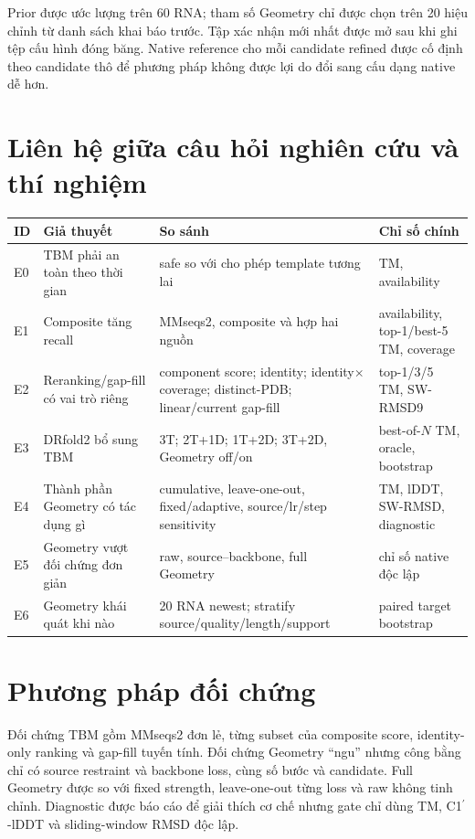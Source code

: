 \documentclass[12pt,a4paper,oneside]{report}
\newcommand{\cprime}{C1$^{\prime}$}
\begin{document}
Prior được ước lượng trên 60 RNA; tham số Geometry chỉ được chọn trên 20 hiệu chỉnh từ
danh sách khai báo trước. Tập xác nhận mới nhất được mở sau khi ghi tệp cấu hình đóng
băng. Native reference cho mỗi candidate refined được cố định theo candidate thô để
phương pháp không được lợi do đổi sang cấu dạng native dễ hơn.

\section{Liên hệ giữa câu hỏi nghiên cứu và thí nghiệm}

\begin{longtable}{p{}p{}p{}p{}}
\toprule
ID & Giả thuyết & So sánh & Chỉ số chính\\
\midrule
\endhead
E0 & TBM phải an toàn theo thời gian & safe so với cho phép template tương lai & TM, availability\\
E1 & Composite tăng recall & MMseqs2, composite và hợp hai nguồn & availability, top-1/best-5 TM, coverage\\
E2 & Reranking/gap-fill có vai trò riêng & component score; identity; identity$\times$coverage; distinct-PDB; linear/current gap-fill & top-1/3/5 TM, SW-RMSD9\\
E3 & DRfold2 bổ sung TBM & 3T; 2T+1D; 1T+2D; 3T+2D, Geometry off/on & best-of-$N$ TM, oracle, bootstrap\\
E4 & Thành phần Geometry có tác dụng gì & cumulative, leave-one-out, fixed/adaptive, source/lr/step sensitivity & TM, lDDT, SW-RMSD, diagnostic\\
E5 & Geometry vượt đối chứng đơn giản & raw, source--backbone, full Geometry & chỉ số native độc lập\\
E6 & Geometry khái quát khi nào & 20 RNA newest; stratify source/quality/length/support & paired target bootstrap\\
\bottomrule
\end{longtable}

\section{Phương pháp đối chứng}

Đối chứng TBM gồm MMseqs2 đơn lẻ, từng subset của composite score, identity-only ranking
và gap-fill tuyến tính. Đối chứng Geometry ``ngu'' nhưng công bằng chỉ có source restraint
và backbone loss, cùng số bước và candidate. Full Geometry được so với fixed strength,
leave-one-out từng loss và raw không tinh chỉnh. Diagnostic được báo cáo để giải thích
cơ chế nhưng gate chỉ dùng TM, \cprime{}-lDDT và sliding-window RMSD độc lập.
\end{document}
